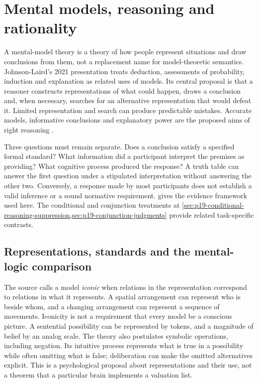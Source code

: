 \chapter{Mental models, reasoning and rationality}
\label{sec:p19-rationality-2-3}

A mental-model theory is a theory of how people represent situations and
draw conclusions from them, not a replacement name for model-theoretic
semantics. Johnson-Laird's 2021 presentation treats deduction, assessments
of probability, induction and explanation as related uses of models. Its
central proposal is that a reasoner constructs representations of what
could happen, draws a conclusion and, when necessary, searches for an
alternative representation that would defeat it. Limited representation
and search can produce predictable mistakes. Accurate models, informative
conclusions and explanatory power are the proposed aims of right reasoning
\cite[pp.~147--156]{JohnsonLaird2021MentalModels}.

Three questions must remain separate. Does a conclusion satisfy a specified
formal standard? What information did a participant interpret the premises
as providing? What cognitive process produced the response? A truth table
can answer the first question under a stipulated interpretation without
answering the other two. Conversely, a response made by most participants
does not establish a valid inference or a sound normative requirement.
 gives the evidence
framework used here. The conditional and conjunction treatments at
\cref{sec:p19-conditional-reasoning-suppression,sec:p19-conjunction-judgments}
provide related task-specific contrasts.

\section{Representations, standards and the mental-logic comparison}
\label{sec:p19-r23-representation}

The source calls a model \emph{iconic} when relations in the representation
correspond to relations in what it represents. A spatial arrangement can
represent who is beside whom, and a changing arrangement can represent a
sequence of movements. Iconicity is not a requirement that every model
be a conscious picture. A sentential possibility can be represented by
tokens, and a magnitude of belief by an analog scale. The theory also
postulates symbolic operations, including negation. Its intuitive process
represents what is true in a possibility while often omitting what is
false; deliberation can make the omitted alternatives explicit. This is a
psychological proposal about representations and their use, not a theorem
that a particular brain implements a valuation list.

